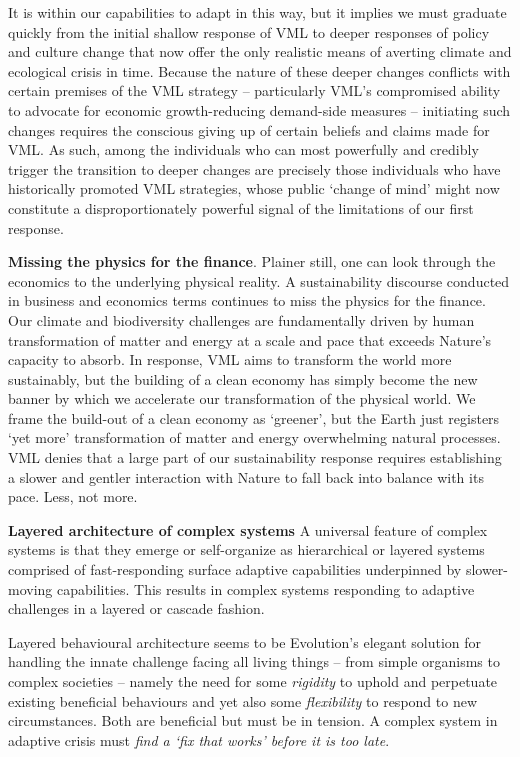 \documentclass[
]{book}
\begin{document}
It is within our
capabilities to adapt in this way, but it implies we must graduate quickly from the initial shallow
response of VML to deeper responses of policy and culture change that now offer the only realistic
means of averting climate and ecological crisis in time. Because the nature of these deeper changes
conflicts with certain premises of the VML strategy -- particularly VML's compromised ability to
advocate for economic growth-reducing demand-side measures -- initiating such changes requires
the conscious giving up of certain beliefs and claims made for VML. As such, among the individuals
who can most powerfully and credibly trigger the transition to deeper changes are precisely those
individuals who have historically promoted VML strategies, whose public `change of mind' might
now constitute a disproportionately powerful signal of the limitations of our first response.

\textbf{Missing the physics for the finance}.
Plainer still, one can look through the economics to the underlying physical reality. A sustainability
discourse conducted in business and economics terms continues to miss the physics for the finance.
Our climate and biodiversity challenges are fundamentally driven by human transformation of matter
and energy at a scale and pace that exceeds Nature's capacity to absorb. In response, VML aims to
transform the world more sustainably, but the building of a clean economy has simply become the
new banner by which we accelerate our transformation of the physical world. We frame the build-out
of a clean economy as `greener', but the Earth just registers `yet more' transformation of matter and
energy overwhelming natural processes. VML denies that a large part of our sustainability response
requires establishing a slower and gentler interaction with Nature to fall back into balance with its
pace. Less, not more.

\textbf{Layered architecture of complex systems}
A universal feature of complex systems is that they emerge or self-organize as hierarchical or layered
systems comprised of fast-responding surface adaptive capabilities underpinned by slower-moving
capabilities. This results in complex systems responding to adaptive challenges in a layered or
cascade fashion.

Layered behavioural architecture seems to be
Evolution's elegant solution for handling the innate challenge facing all living things -- from simple
organisms to complex societies -- namely the need for some \emph{rigidity} to uphold and perpetuate existing
beneficial behaviours and yet also some \emph{flexibility} to respond to new circumstances. Both are
beneficial but must be in tension.
A complex system in adaptive crisis
must \emph{find a `fix that works' before it is too late}.
\end{document}

